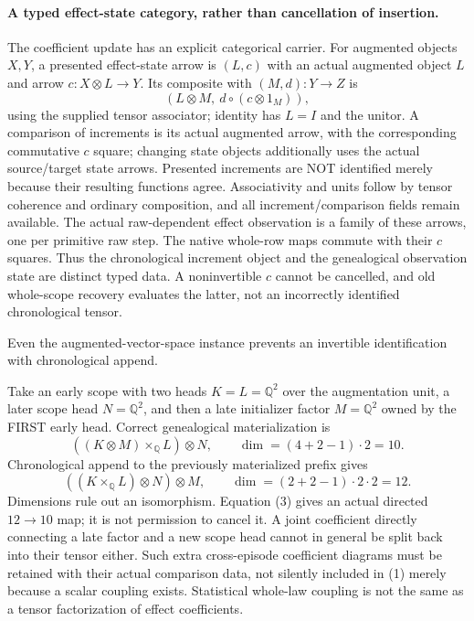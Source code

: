 \documentclass[11pt]{article}\usepackage{amsmath,amssymb,amsthm}
\begin{document}
\paragraph{A typed effect-state category, rather than cancellation of insertion.}
The coefficient update has an explicit categorical carrier. For augmented objects $X,Y$, a presented effect-state arrow is $(L,c)$ with an actual augmented object $L$ and arrow $c:X\otimes L\to Y$. Its composite with $(M,d):Y\to Z$ is
\[
 (L\otimes M,\ d\circ(c\otimes1_M)),
\]
using the supplied tensor associator; identity has $L=I$ and the unitor. A comparison of increments is its actual augmented arrow, with the corresponding commutative $c$ square; changing state objects additionally uses the actual source/target state arrows. Presented increments are NOT identified merely because their resulting functions agree. Associativity and units follow by tensor coherence and ordinary composition, and all increment/comparison fields remain available. The actual raw-dependent effect observation is a family of these arrows, one per primitive raw step. The native whole-row maps commute with their $c$ squares. Thus the chronological increment object and the genealogical observation state are distinct typed data. A noninvertible $c$ cannot be cancelled, and old whole-scope recovery evaluates the latter, not an incorrectly identified chronological tensor.

\begin{proposition}
Even the augmented-vector-space instance prevents an invertible identification with chronological append.
\end{proposition}
Take an early scope with two heads $K=L=\mathbb Q^2$ over the augmentation unit, a later scope head $N=\mathbb Q^2$, and then a late initializer factor $M=\mathbb Q^2$ owned by the FIRST early head. Correct genealogical materialization is
\[
 ((K\otimes M)\times_{\mathbb Q}L)\otimes N,
 \qquad\dim= (4+2-1)\cdot2=10.
\]
Chronological append to the previously materialized prefix gives
\[
 ((K\times_{\mathbb Q}L)\otimes N)\otimes M,
 \qquad\dim=(2+2-1)\cdot2\cdot2=12.
\]
Dimensions rule out an isomorphism. Equation (3) gives an actual directed $12\to10$ map; it is not permission to cancel it. A joint coefficient directly connecting a late factor and a new scope head cannot in general be split back into their tensor either. Such extra cross-episode coefficient diagrams must be retained with their actual comparison data, not silently included in (1) merely because a scalar coupling exists. Statistical whole-law coupling is not the same as a tensor factorization of effect coefficients.
\end{document}
